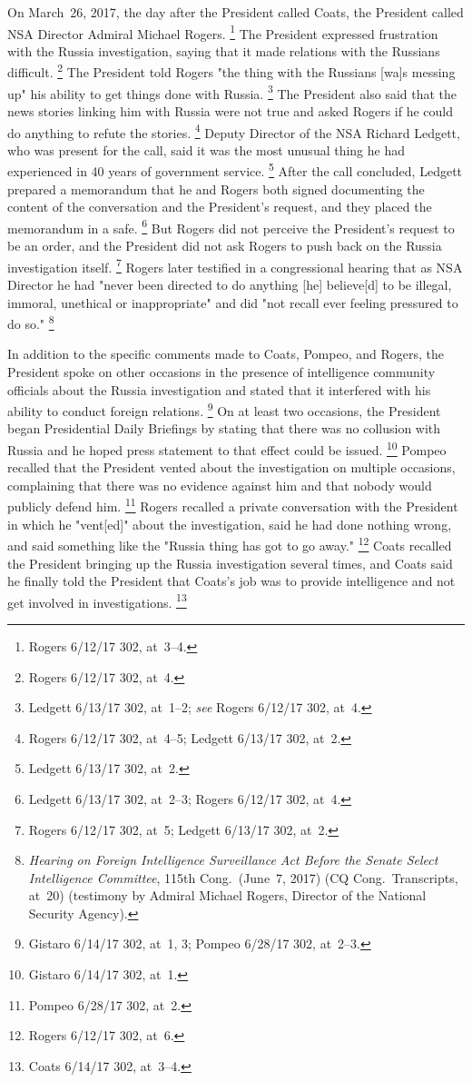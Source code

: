 On March~26, 2017, the day after the President called Coats, the President called NSA Director Admiral Michael Rogers.%
\footnote{Rogers 6/12/17 302, at~3--4.}
The President expressed frustration with the Russia investigation, saying that it made relations with the Russians difficult.%
\footnote{Rogers 6/12/17 302, at~4.}
The President told Rogers "the thing with the Russians [wa]s messing up" his ability to get things done with Russia.%
\footnote{Ledgett 6/13/17 302, at~1--2;
\textit{see} Rogers 6/12/17 302, at~4.}
The President also said that the news stories linking him with Russia were not true and asked Rogers if he could do anything to refute the stories.%
\footnote{Rogers 6/12/17 302, at~4--5;
Ledgett 6/13/17 302, at~2.}
Deputy Director of the NSA Richard Ledgett, who was present for the call, said it was the most unusual thing he had experienced in 40 years of government service.%
\footnote{Ledgett 6/13/17 302, at~2.}
After the call concluded, Ledgett prepared a memorandum that he and Rogers both signed documenting the content of the conversation and the President's request, and they placed the memorandum in a safe.%
\footnote{Ledgett 6/13/17 302, at~2--3;
Rogers 6/12/17 302, at~4.}
But Rogers did not perceive the President's request to be an order, and the President did not ask Rogers to push back on the Russia investigation itself.%
\footnote{Rogers 6/12/17 302, at~5;
Ledgett 6/13/17 302, at~2.}
Rogers later testified in a congressional hearing that as NSA Director he had "never been directed to do anything [he] believe[d] to be illegal, immoral, unethical or inappropriate" and did "not recall ever feeling pressured to do so."%
\footnote{\textit{Hearing on Foreign Intelligence Surveillance Act Before the Senate Select Intelligence Committee}, 115th Cong.\ (June~7, 2017) (CQ Cong.\ Transcripts, at~20) (testimony by Admiral Michael Rogers, Director of the National Security Agency).}

In addition to the specific comments made to Coats, Pompeo, and Rogers, the President spoke on other occasions in the presence of intelligence community officials about the Russia investigation and stated that it interfered with his ability to conduct foreign relations.%
\footnote{Gistaro 6/14/17 302, at~1, 3;
Pompeo 6/28/17 302, at~2--3.}
On at least two occasions, the President began Presidential Daily Briefings by stating that there was no collusion with Russia and he hoped press statement to that effect could be issued.%
\footnote{Gistaro 6/14/17 302, at~1.}
Pompeo recalled that the President vented about the investigation on multiple occasions, complaining that there was no evidence against him and that nobody would publicly defend him.%
\footnote{Pompeo 6/28/17 302, at~2.}
Rogers recalled a private conversation with the President in which he "vent[ed]" about the investigation, said he had done nothing wrong, and said something like the "Russia thing has got to go away."%
\footnote{Rogers 6/12/17 302, at~6.}
Coats recalled the President bringing up the Russia investigation several times, and Coats said he finally told the President that Coats's job was to provide intelligence and not get involved in investigations.%
\footnote{Coats 6/14/17 302, at~3--4.}

